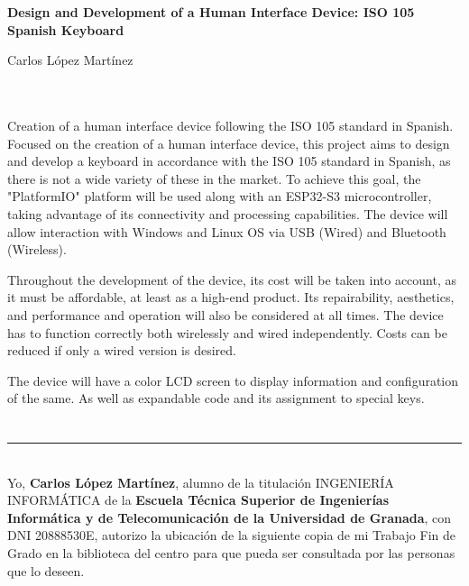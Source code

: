 \thispagestyle{empty}


\begin{center}
{\large\bfseries Design and Development of a Human Interface Device: ISO 105 Spanish Keyboard}\\
\end{center}
\begin{center}
Carlos López Martínez\\
\end{center}

\\

\vspace{0.7cm}
\\

Creation of a human interface device following the ISO 105 standard in Spanish. Focused on the creation of a human interface device, this project aims to design and develop a keyboard in accordance with the ISO 105 standard in Spanish, as there is not a wide variety of these in the market. To achieve this goal, the "PlatformIO" platform will be used along with an ESP32-S3 microcontroller, taking advantage of its connectivity and processing capabilities. The device will allow interaction with Windows and Linux OS via USB (Wired) and Bluetooth (Wireless).

Throughout the development of the device, its cost will be taken into account, as it must be affordable, at least as a high-end product. Its repairability, aesthetics, and performance and operation will also be considered at all times. The device has to function correctly both wirelessly and wired independently. Costs can be reduced if only a wired version is desired.

The device will have a color LCD screen to display information and configuration of the same. As well as expandable code and its assignment to special keys.

\chapter*{}
\thispagestyle{empty}

\noindent\rule[-1ex]{\textwidth}{2pt}\\[4.5ex]

Yo, \textbf{Carlos López Martínez}, alumno de la titulación INGENIERÍA INFORMÁTICA de la \textbf{Escuela Técnica Superior
de Ingenierías Informática y de Telecomunicación de la Universidad de Granada}, con DNI 20888530E, autorizo la
ubicación de la siguiente copia de mi Trabajo Fin de Grado en la biblioteca del centro para que pueda ser
consultada por las personas que lo deseen.

